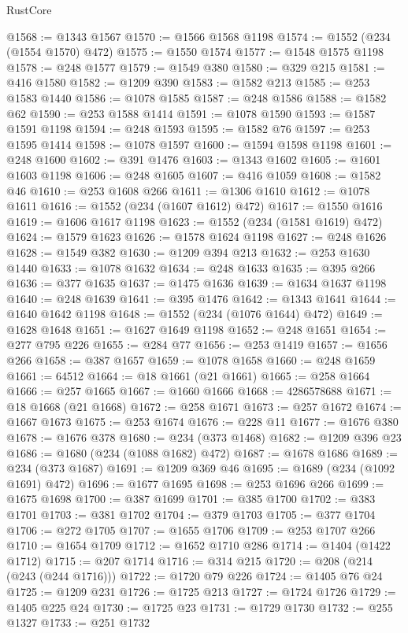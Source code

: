 \begin{lexlean}{RustCore}
\begin{coremodule}
@1568 := @1343 @1567
@1570 := @1566 @1568 @1198
@1574 := @1552 (@234 (@1554 @1570) @472)
@1575 := @1550 @1574
@1577 := @1548 @1575 @1198
@1578 := @248 @1577
@1579 := @1549 @380
@1580 := @329 @215
@1581 := @416 @1580
@1582 := @1209 @390
@1583 := @1582 @213
@1585 := @253 @1583 @1440
@1586 := @1078 @1585
@1587 := @248 @1586
@1588 := @1582 @62
@1590 := @253 @1588 @1414
@1591 := @1078 @1590
@1593 := @1587 @1591 @1198
@1594 := @248 @1593
@1595 := @1582 @76
@1597 := @253 @1595 @1414
@1598 := @1078 @1597
@1600 := @1594 @1598 @1198
@1601 := @248 @1600
@1602 := @391 @1476
@1603 := @1343 @1602
@1605 := @1601 @1603 @1198
@1606 := @248 @1605
@1607 := @416 @1059
@1608 := @1582 @46
@1610 := @253 @1608 @266
@1611 := @1306 @1610
@1612 := @1078 @1611
@1616 := @1552 (@234 (@1607 @1612) @472)
@1617 := @1550 @1616
@1619 := @1606 @1617 @1198
@1623 := @1552 (@234 (@1581 @1619) @472)
@1624 := @1579 @1623
@1626 := @1578 @1624 @1198
@1627 := @248 @1626
@1628 := @1549 @382
@1630 := @1209 @394 @213
@1632 := @253 @1630 @1440
@1633 := @1078 @1632
@1634 := @248 @1633
@1635 := @395 @266
@1636 := @377 @1635
@1637 := @1475 @1636
@1639 := @1634 @1637 @1198
@1640 := @248 @1639
@1641 := @395 @1476
@1642 := @1343 @1641
@1644 := @1640 @1642 @1198
@1648 := @1552 (@234 (@1076 @1644) @472)
@1649 := @1628 @1648
@1651 := @1627 @1649 @1198
@1652 := @248 @1651
@1654 := @277 @795 @226
@1655 := @284 @77
@1656 := @253 @1419
@1657 := @1656 @266
@1658 := @387 @1657
@1659 := @1078 @1658
@1660 := @248 @1659
@1661 := 64512
@1664 := @18 @1661 (@21 @1661)
@1665 := @258 @1664
@1666 := @257 @1665
@1667 := @1660 @1666
@1668 := 4286578688
@1671 := @18 @1668 (@21 @1668)
@1672 := @258 @1671
@1673 := @257 @1672
@1674 := @1667 @1673
@1675 := @253 @1674
@1676 := @228 @11
@1677 := @1676 @380
@1678 := @1676 @378
@1680 := @234 (@373 @1468)
@1682 := @1209 @396 @23
@1686 := @1680 (@234 (@1088 @1682) @472)
@1687 := @1678 @1686
@1689 := @234 (@373 @1687)
@1691 := @1209 @369 @46
@1695 := @1689 (@234 (@1092 @1691) @472)
@1696 := @1677 @1695
@1698 := @253 @1696 @266
@1699 := @1675 @1698
@1700 := @387 @1699
@1701 := @385 @1700
@1702 := @383 @1701
@1703 := @381 @1702
@1704 := @379 @1703
@1705 := @377 @1704
@1706 := @272 @1705
@1707 := @1655 @1706
@1709 := @253 @1707 @266
@1710 := @1654 @1709
@1712 := @1652 @1710 @286
@1714 := @1404 (@1422 @1712)
@1715 := @207 @1714
@1716 := @314 @215
@1720 := @208 (@214 (@243 (@244 @1716)))
@1722 := @1720 @79 @226
@1724 := @1405 @76 @24
@1725 := @1209 @231
@1726 := @1725 @213
@1727 := @1724 @1726
@1729 := @1405 @225 @24
@1730 := @1725 @23
@1731 := @1729 @1730
@1732 := @255 @1327
@1733 := @251 @1732

\end{coremodule}
\end{lexlean}
